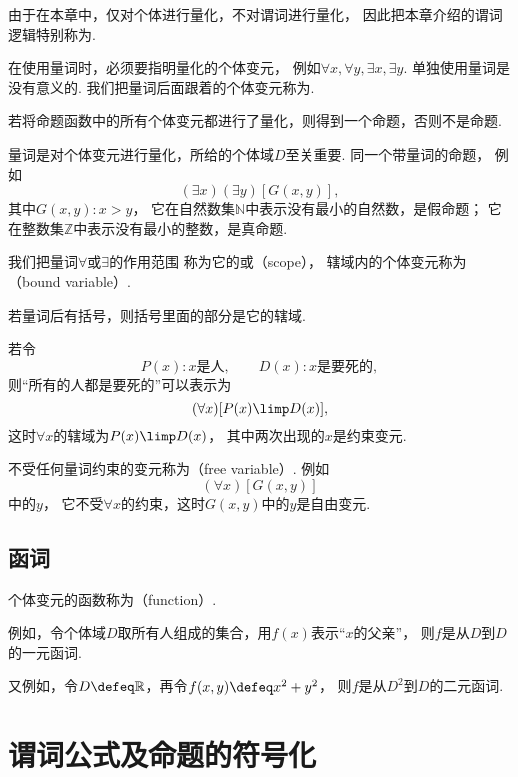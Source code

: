 由于在本章中，仅对个体进行量化，不对谓词进行量化，
因此把本章介绍的谓词逻辑特别称为.

在使用量词时，必须要指明量化的个体变元，
例如\(\forall x,\forall y,\exists x,\exists y\).
单独使用量词是没有意义的.
我们把量词后面跟着的个体变元称为.

若将命题函数中的所有个体变元都进行了量化，则得到一个命题，否则不是命题.

量词是对个体变元进行量化，所给的个体域\(D\)至关重要.
同一个带量词的命题，
例如\begin{equation*}
	(\exists x)(\exists y)[G(x,y)],
\end{equation*}
其中\(G(x,y): x>y\)，
它在自然数集\(\mathbb{N}\)中表示没有最小的自然数，是假命题；
它在整数集\(\mathbb{Z}\)中表示没有最小的整数，是真命题.

我们把量词\(\forall\)或\(\exists\)的作用范围
称为它的或（scope），
辖域内的个体变元称为（bound variable）.

若量词后有括号，则括号里面的部分是它的辖域.

若令\begin{equation*}
	P(x):
	\text{$x$是人},
	\qquad
	D(x):
	\text{$x$是要死的},
\end{equation*}
则“所有的人都是要死的”可以表示为\begin{equation*}
	(\forall x)[P(x) \limp D(x)],
\end{equation*}
这时\(\forall x\)的辖域为\(P(x) \limp D(x)\)，
其中两次出现的\(x\)是约束变元.

不受任何量词约束的变元称为（free variable）.
例如\begin{equation*}
	(\forall x)[G(x,y)]
\end{equation*}中的\(y\)，
它不受\(\forall x\)的约束，这时\(G(x,y)\)中的\(y\)是自由变元.

\subsection{函词}
个体变元的函数称为（function）.

例如，令个体域\(D\)取所有人组成的集合，用\(f(x)\)表示“\(x\)的父亲”，
则\(f\)是从\(D\)到\(D\)的一元函词.

又例如，令\(D \defeq \mathbb{R}\)，再令\(f(x,y) \defeq x^2 + y^2\)，
则\(f\)是从\(D^2\)到\(D\)的二元函词.

\section{谓词公式及命题的符号化}
